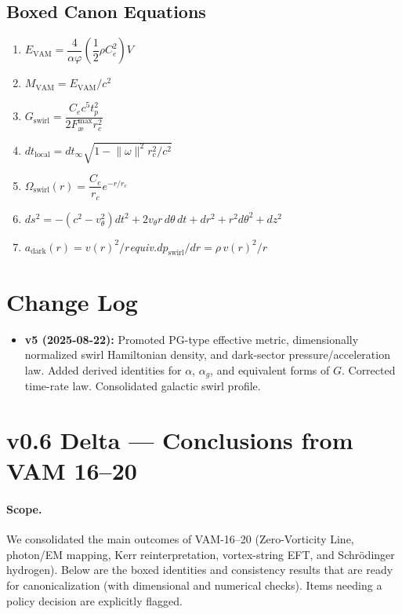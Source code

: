\documentclass[11pt,a4paper]{article}
\newcommand{\aeether}{\text{\ae}} %
\begin{document}
    \subsection{Boxed Canon Equations}
    \begin{enumerate}
        \item $\boxed{E_{\mathrm{VAM}} = \dfrac{4}{\alpha\varphi}\left(\dfrac{1}{2}\rho C_e^2\right)V}$
        \item $\boxed{M_{\mathrm{VAM}} = E_{\mathrm{VAM}}/c^2}$
        \item $\boxed{G_{\mathrm{swirl}} = \dfrac{C_e c^5 t_p^2}{2F_{\aeether}^{\max} r_c^2}}$
        \item $\boxed{dt_{\mathrm{local}} = dt_{\infty}\sqrt{1-\lVert\omega\rVert^{2} r_c^{2}/c^2}}$
        \item $\boxed{\Omega_{\mathrm{swirl}}(r) = \dfrac{C_e}{r_c}e^{-r/r_c}}$
        \item $\boxed{ds^2 = -(c^2 - v_\theta^2)dt^2 + 2 v_\theta r\,d\theta\,dt + dr^2 + r^2 d\theta^2 + dz^2}$
        \item $\boxed{a_{\mathrm{dark}}(r)=v(r)^2/r}$\quad\emph{equiv.}\quad$\boxed{dp_{\mathrm{swirl}}/dr=\rho\,v(r)^2/r}$
    \end{enumerate}

    \section*{Change Log}
    \begin{itemize}
        \item \textbf{v5 (2025-08-22):} Promoted PG-type effective metric, dimensionally normalized swirl Hamiltonian density, and dark-sector pressure/acceleration law. Added derived identities for $\alpha$, $\alpha_g$, and equivalent forms of $G$. Corrected time-rate law. Consolidated galactic swirl profile.
    \end{itemize}




    \section*{v0.6 Delta — Conclusions from VAM 16–20}
    \label{sec:v06-delta}

    \paragraph{Scope.}
    We consolidated the main outcomes of VAM-16–20 (Zero-Vorticity Line, photon/EM mapping, Kerr reinterpretation, vortex-string EFT, and Schr\"odinger hydrogen). Below are the boxed identities and consistency results that are ready for canonicalization (with dimensional and numerical checks). Items needing a policy decision are explicitly flagged.
\end{document}
